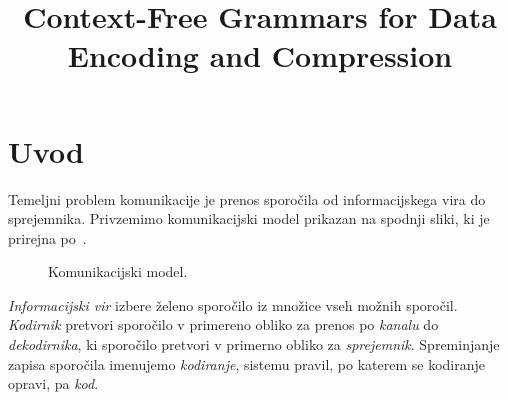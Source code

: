 \documentclass[fin1, tisk]{fmfdelo}
\title{Context-Free Grammars for Data Encoding and Compression}
\theoremstyle{definition}
\begin{document}
\section{Uvod}

Temeljni problem komunikacije je prenos sporočila od informacijskega vira do sprejemnika.
Privzemimo komunikacijski model prikazan na spodnji sliki, ki je prirejna po~\cite{Shannon1949}.
\begin{figure}[H]
    \centering
    \caption{Komunikacijski model.}
\end{figure}

\emph{Informacijski vir} izbere želeno sporočilo iz množice vseh možnih sporočil.
\emph{Kodirnik} pretvori sporočilo v primereno obliko za prenos po \emph{kanalu}
do \emph{dekodirnika}, ki sporočilo pretvori v primerno obliko za \emph{sprejemnik}.
Spreminjanje zapisa sporočila imenujemo \emph{kodiranje}, sistemu pravil, po katerem se kodiranje
opravi, pa \emph{kod}. 
\end{document}
